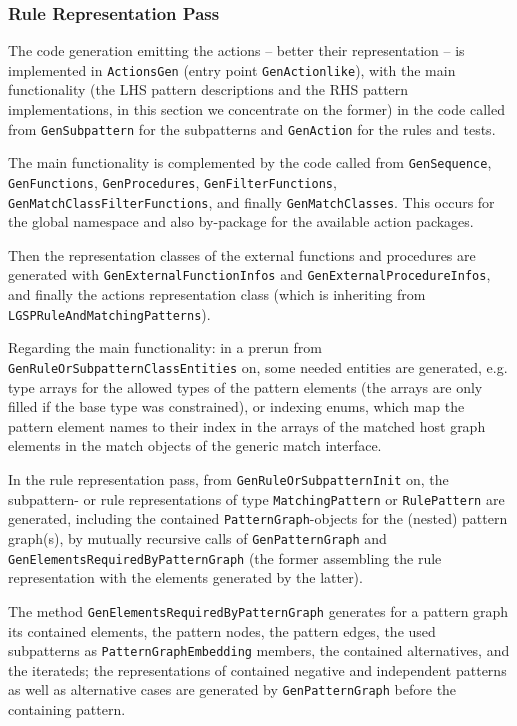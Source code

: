 \subsubsection*{Rule Representation Pass}

The code generation emitting the actions -- better their representation -- is implemented in \texttt{ActionsGen} (entry point \texttt{Gen\-Actionlike}), with the main functionality (the LHS pattern descriptions and the RHS pattern implementations, in this section we concentrate on the former) in the code called from \texttt{Gen\-Subpattern} for the subpatterns and \texttt{Gen\-Action} for the rules and tests.

The main functionality is complemented by the code called from \texttt{Gen\-Sequence}, \texttt{Gen\-Functions}, \texttt{Gen\-Procedures}, \texttt{Gen\-Filter\-Functions}, \texttt{Gen\-Match\-Class\-Filter\-Functions}, and finally \texttt{Gen\-Match\-Classes}.
This occurs for the global namespace and also by-package for the available action packages.

Then the representation classes of the external functions and procedures are generated with \texttt{Gen\-External\-Function\-Infos} and \texttt{Gen\-External\-Procedure\-Infos}, and finally the actions representation class (which is inheriting from \texttt{LGSP\-Rule\-And\-Matching\-Patterns}).

Regarding the main functionality:
in a prerun from \texttt{Gen\-Rule\-Or\-Subpattern\-Class\-Entities} on, some needed entities are generated, e.g. type arrays for the allowed types of the pattern elements (the arrays are only filled if the base type was constrained), or indexing enums, which map the pattern element names to their index in the arrays of the matched host graph elements in the match objects of the generic match interface.

In the rule representation pass, from \texttt{Gen\-Rule\-Or\-Subpattern\-Init} on, the subpattern- or rule representations of type \texttt{Matching\-Pattern} or \texttt{Rule\-Pattern} are generated, including the contained \texttt{Pattern\-Graph}-objects for the (nested) pattern graph(s), by mutually recursive calls of \texttt{Gen\-Pattern\-Graph} and \texttt{Gen\-Elements\-Required\-By\-Pattern\-Graph} (the former assembling the rule representation with the elements generated by the latter).

The method \texttt{Gen\-Elements\-Required\-By\-Pattern\-Graph} generates for a pattern graph its contained elements, the pattern nodes, the pattern edges, the used subpatterns as \texttt{Pattern\-Graph\-Embedding} members, the contained alternatives, and the iterateds; the representations of contained negative and independent patterns as well as alternative cases are generated by \texttt{Gen\-Pattern\-Graph} before the containing pattern. 

